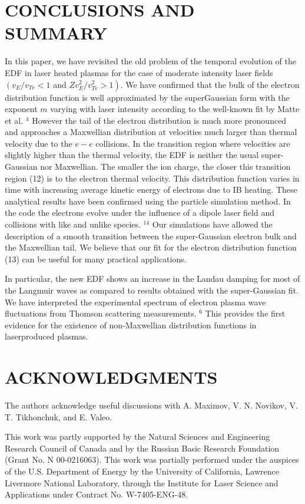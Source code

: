 \documentclass[10pt]{article}
\begin{document}
\section{CONCLUSIONS AND SUMMARY}
In this paper, we have revisited the old problem of the temporal evolution of the EDF in laser heated plasmas for the case of moderate intensity laser fields $\left(v_{E} / v_{T e}<1\right.$ and $\left.Z v_{E}^{2} / v_{T e}^{2}>1\right)$. We have confirmed that the bulk of the electron distribution function is well approximated by the superGaussian form with the exponent $m$ varying with laser intensity according to the well-known fit by Matte et al. ${ }^{4}$ However the tail of the electron distribution is much more pronounced and approaches a Maxwellian distribution at velocities much larger than thermal velocity due to the $e-e$ collisions. In the transition region where velocities are slightly higher than the thermal velocity, the EDF is neither the usual super-Gaussian nor Maxwellian. The smaller the ion charge, the closer this transition region (12) is to the electron thermal velocity. This distribution function varies in time with increasing average kinetic energy of electrons due to IB heating. These analytical results have been confirmed using the particle simulation method. In the code the electrons evolve under the influence of a dipole laser field and collisions with like and unlike species. ${ }^{14}$ Our simulations have allowed the description of a smooth transition between the super-Gaussian electron bulk and the Maxwellian tail. We believe that our fit for the electron distribution function (13) can be useful for many practical applications.

In particular, the new EDF shows an increase in the Landau damping for most of the Langmuir waves as compared to results obtained with the super-Gaussian fit. We have interpreted the experimental spectrum of electron plasma wave fluctuations from Thomson scattering measurements. $^{6}$ This provides the first evidence for the existence of non-Maxwellian distribution functions in laserproduced plasmas.

\section{ACKNOWLEDGMENTS}
The authors acknowledge useful discussions with A. Maximov, V. N. Novikov, V. T. Tikhonchuk, and E. Valeo.

This work was partly supported by the Natural Sciences and Engineering Research Council of Canada and by the Russian Basic Research Foundation (Grant No. N 00-0216063). This work was partially performed under the auspices of the U.S. Department of Energy by the University of California, Lawrence Livermore National Laboratory, through the Institute for Laser Science and Applications under Contract No. W-7405-ENG-48.
\end{document}
